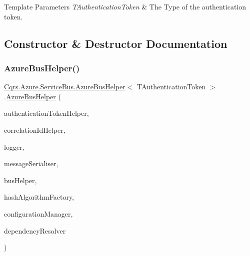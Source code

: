 \begin{DoxyTemplParams}{Template Parameters}
{\em T\+Authentication\+Token} & The Type of the authentication token.\\
\hline
\end{DoxyTemplParams}


\subsection{Constructor \& Destructor Documentation}
\mbox{\label{classCqrs_1_1Azure_1_1ServiceBus_1_1AzureBusHelper_aed54a79efffdf9799a3baae46c2b7fb4_aed54a79efffdf9799a3baae46c2b7fb4}} 
\subsubsection{\texorpdfstring{Azure\+Bus\+Helper()}{AzureBusHelper()}}
{\footnotesize\ttfamily \hyperlink{classCqrs_1_1Azure_1_1ServiceBus_1_1AzureBusHelper}{Cqrs.\+Azure.\+Service\+Bus.\+Azure\+Bus\+Helper}$<$ T\+Authentication\+Token $>$.\hyperlink{classCqrs_1_1Azure_1_1ServiceBus_1_1AzureBusHelper}{Azure\+Bus\+Helper} (\begin{DoxyParamCaption}\item[{\hyperlink{interfaceCqrs_1_1Authentication_1_1IAuthenticationTokenHelper}{I\+Authentication\+Token\+Helper}$<$ T\+Authentication\+Token $>$}]{authentication\+Token\+Helper,  }\item[{I\+Correlation\+Id\+Helper}]{correlation\+Id\+Helper,  }\item[{I\+Logger}]{logger,  }\item[{\hyperlink{interfaceCqrs_1_1Azure_1_1ServiceBus_1_1IMessageSerialiser}{I\+Message\+Serialiser}$<$ T\+Authentication\+Token $>$}]{message\+Serialiser,  }\item[{\hyperlink{interfaceCqrs_1_1Bus_1_1IBusHelper}{I\+Bus\+Helper}}]{bus\+Helper,  }\item[{\hyperlink{interfaceCqrs_1_1Bus_1_1IHashAlgorithmFactory}{I\+Hash\+Algorithm\+Factory}}]{hash\+Algorithm\+Factory,  }\item[{\hyperlink{interfaceCqrs_1_1Configuration_1_1IConfigurationManager}{I\+Configuration\+Manager}}]{configuration\+Manager,  }\item[{\hyperlink{interfaceCqrs_1_1Configuration_1_1IDependencyResolver}{I\+Dependency\+Resolver}}]{dependency\+Resolver }\end{DoxyParamCaption})}



